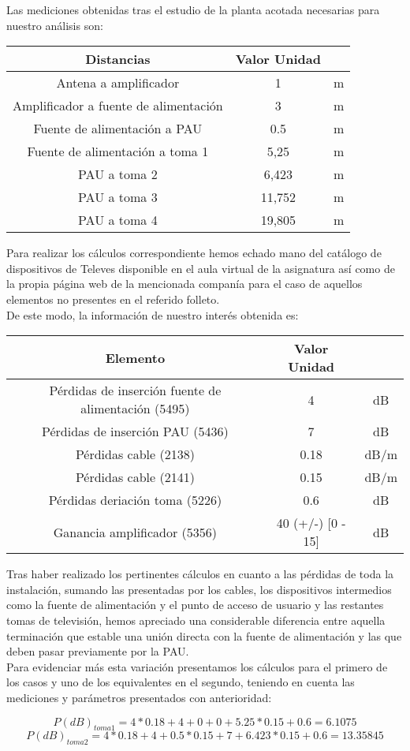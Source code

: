 \documentclass{article}[12 pt]
\begin{document}
		Las mediciones obtenidas tras el estudio de la planta acotada necesarias para nuestro análisis son:

		\begin{tabular}{| c | c | c |}
			\hline
			\textbf{Distancias} & \textbf{Valor} \textbf{Unidad}\\
			\hline
			Antena a amplificador & 1 & m\\
			\hline
			Amplificador a fuente de alimentación & 3 & m\\
			\hline
			Fuente de alimentación a PAU & 0.5 & m\\
			\hline
			Fuente de alimentación a toma 1 & 5,25 & m\\
			\hline
			PAU a toma 2 & 6,423 & m\\
			\hline
			PAU a toma 3 & 11,752 & m\\
			\hline
			PAU a toma 4  & 19,805 & m\\
			\hline
		\end{tabular}

		Para realizar los cálculos correspondiente hemos echado mano del catálogo de dispositivos de Televes disponible en el aula virtual de la asignatura así como de la propia página web de la mencionada companía para el caso de aquellos elementos no presentes en el referido folleto.\\

		De este modo, la información de nuestro interés obtenida es:

		\begin{tabular}{| c | c | c |}
			\hline
			\textbf{Elemento} & \textbf{Valor} \textbf{Unidad}\\
			\hline
			Pérdidas de inserción fuente de alimentación (5495) & 4 & dB\\
			\hline
			Pérdidas de inserción PAU (5436) & 7 & dB\\
			\hline
			Pérdidas cable (2138) & 0.18 & dB/m\\
			\hline
			Pérdidas cable (2141) & 0.15 & dB/m\\
			\hline
			Pérdidas deriación toma (5226) & 0.6 & dB\\
			\hline
			Ganancia amplificador (5356) & 40 (+/-) [0 - 15] & dB\\
			\hline
		\end{tabular}

		Tras haber realizado los pertinentes cálculos en cuanto a las pérdidas de toda la instalación, sumando las presentadas por los cables, los dispositivos intermedios como la fuente de alimentación y el punto de acceso de usuario y las restantes tomas de televisión, hemos apreciado una considerable diferencia entre aquella terminación que estable una unión directa con la fuente de alimentación y las que deben pasar previamente por la PAU.\\

		Para evidenciar más esta variación presentamos los cálculos para el primero de los casos y uno de los equivalentes en el segundo, teniendo en cuenta las mediciones y parámetros presentados con anterioridad:

		$$P(dB)_{toma1} = 4*0.18 + 4 + 0 + 0 + 5.25*0.15 + 0.6 = 6.1075$$
		$$P(dB)_{toma2} = 4*0.18 + 4 + 0.5*0.15 + 7 + 6.423*0.15 + 0.6 = 13.35845$$
\end{document}
